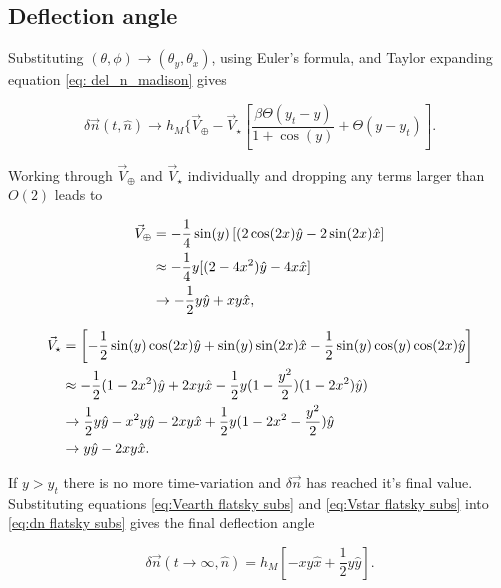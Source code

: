 \documentclass{article}
\begin{document}
\subsection{Deflection angle}
Substituting $(\theta, \phi) \rightarrow (\theta_y, \theta_x)$, using Euler's formula, and Taylor expanding equation \ref{eq: del_n_madison} gives


\begin{equation}
    \delta\vec{n}(t,\hat{n}) \rightarrow h_M \{\vec{V}_\oplus - \vec{V}_\star\left[\frac{\beta\Theta(y_t - y)}{1+\cos(y)} + \Theta(y-y_t)\right]. 
    \label{eq:dn flatsky subs}
\end{equation}

Working through $\vec{V}_\oplus$ and $\vec{V}_\star$ individually and dropping any terms larger than $O(2)$ leads to

\begin{align}
    \vec{V}_\oplus &= -\frac{1}{4}\sin(y)\left[(2\cos(2x)\hat{y} - 2\sin(2x)\hat{x}\right] \notag \\
    &\approx -\frac{1}{4}y[(2-4x^2)\hat{y} - 4x\hat{x}] \notag \\
    &\rightarrow -\frac{1}{2}y\hat{y} + xy\hat{x}, 
    \label{eq:Vearth flatsky subs}
\end{align}

\begin{align}
    \vec{V}_\star &= \left[-\frac{1}{2}\sin(y)\cos(2x)\hat{y} + \sin(y)\sin(2x)\hat{x} - \frac{1}{2} \sin(y)\cos(y)\cos(2x)\hat{y}\right] \notag \\
    &\approx -\frac{1}{2}(1-2x^2)\hat{y} + 2xy\hat{x} - \frac{1}{2}y(1-\frac{y^2}{2})(1-2x^2)\hat{y}) \notag \\
    &\rightarrow \frac{1}{2}y\hat{y} - x^2y\hat{y} - 2xy\hat{x} +\frac{1}{2}y(1-2x^2-\frac{y^2}{2})\hat{y} \notag \\
    &\rightarrow y\hat{y} - 2xy\hat{x}.
    \label{eq:Vstar flatsky subs}
\end{align}

If $y > y_t$ there is no more time-variation and $\delta\vec{n}$ has reached it's final value. Substituting equations \ref{eq:Vearth flatsky subs} and \ref{eq:Vstar flatsky subs} into \ref{eq:dn flatsky subs} gives the final deflection angle 

\begin{equation}
    \delta\vec{n}(t\rightarrow\infty,\hat{n}) = h_M[-xy\hat{x} + \frac{1}{2}y\hat{y}].
    \label{eq: final flatsky deflection}
\end{equation}
\end{document}

